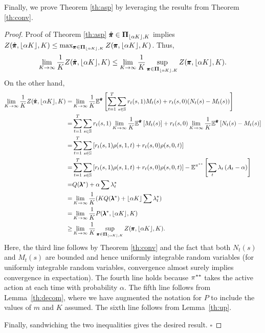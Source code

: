 Finally, we prove Theorem \ref{th:asp} by leveraging the results from Theorem \ref{th:conv}.
\begin{proof}{Proof of Theorem \ref{th:asp}}
$\hat{\pmb{\pi}} \in \mathbf{\Pi}_{\lfloor \alpha K\rfloor,K}$ implies $Z(\hat{\pmb{\pi}},\lfloor \alpha K\rfloor,K) \leq \max_{\pmb{\pi}\in\mathbf{\Pi}_{\lfloor \alpha K\rfloor,K}}Z(\pmb{\pi},\lfloor \alpha K\rfloor,K)$.  Thus,
\begin{equation*}
\lim_{K\rightarrow\infty}\frac{1}{K}Z(\hat{\pmb{\pi}},\lfloor \alpha K\rfloor,K) \leq  \lim_{K\rightarrow\infty}\frac{1}{K}\sup_{\pmb{\pi}\in\mathbf{\Pi}_{\lfloor \alpha K\rfloor,K}}Z(\pmb{\pi},\lfloor \alpha K\rfloor,K).
\end{equation*}
On the other hand,
\begin{align*}
\lim_{K\rightarrow\infty}\frac{1}{K}Z(\hat{\pmb{\pi}},\lfloor \alpha K\rfloor,K) 
=&\lim_{K\rightarrow\infty}\frac{1}{K}\mathbb{E}^{\hat{\pmb{\pi}}}\left[\sum_{t=1}^{T}\sum_{s\in\mathbb{S}}r_t(s,1) M_{t}(s)+r_t(s,0) (N_{t}(s)-M_{t}(s))\right]\\
=&\sum_{t=1}^{T}\sum_{s\in\mathbb{S}}r_t(s,1) \lim_{K\rightarrow\infty}\frac{1}{K}\mathbb{E}^{\hat{\pmb{\pi}}}\left[M_{t}(s)\right]+r_t(s,0) \lim_{K\rightarrow\infty}\frac{1}{K}\mathbb{E}^{\hat{\pmb{\pi}}}\left[N_{t}(s)-M_{t}(s)\right]\\
=&\sum_{t=1}^{T}\sum_{s\in \mathbb{S}}\left[r_t(s,1) \rho(s,1,t)+r_t(s,0) \rho(s,0,t) \right]\\
=&\sum_{t=1}^{T}\sum_{s\in \mathbb{S}}\left[r_t(s,1) \rho(s,1,t)+r_t(s,0) \rho(s,0,t) \right] - \mathbb{E}^{\pi^{**}}\left[\sum_{t}\lambda_t \left(A_t-\alpha\right)\right]\\
=& Q(\pmb{\lambda}^*)+\alpha \sum\lambda^*_t\\
=& \lim_{K\rightarrow\infty}\frac{1}{K}(KQ(\pmb{\lambda}^*)+\lfloor \alpha K \rfloor\sum\lambda^*_t)\\
=& \lim_{K\rightarrow\infty}\frac{1}{K} P(\pmb{\lambda}^*,\lfloor \alpha K \rfloor, K)\\
\geq& \lim_{K\rightarrow\infty}\frac{1}{K}\sup_{\pmb{\pi}\in\mathbf{\Pi}_{\lfloor \alpha K\rfloor,K}}Z(\pmb{\pi},\lfloor \alpha K\rfloor,K).
\end{align*}
Here, the third line follows by Theorem \ref{th:conv} and the fact that both $N_t(s)$ and $M_t(s)$ are bounded and hence uniformly integrable random variables (for uniformly integrable random variables, convergence almost surely implies convergence in expectation). The fourth line holds because $\pi^{**}$ takes the active action at each time with probability $\alpha$. 
The fifth line follows from Lemma~\ref{th:decom}, where we have augmented the notation for $P$ to include the values of $m$ and $K$ assumed.
The sixth line follows from Lemma~\ref{th:up}.

Finally, sandwiching the two inequalities gives the desired result.
$\square$
\end{proof}